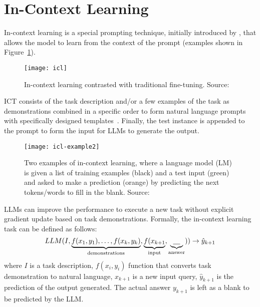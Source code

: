 \section{In-Context Learning}
\label{sec:in-context-learning}
In-context learning is a special prompting technique, initially introduced by \textcite{brown2020language}, that allows the model to learn from the context of the prompt (examples shown in Figure~\ref{fig:in-context-learning}).
\begin{figure}[h!]
	\centering
	\texttt{[image: icl]}
	\caption{In-context learning contrasted with traditional fine-tuning. Source: \textcite{brown2020language}}
	\label{fig:in-context-learning}
\end{figure}
ICT consists of the task description and/or a few examples of the task as demonstrations combined in a specific order to form natural language prompts with specifically designed templates~\cite{brown2020language}.
Finally, the test instance is appended to the prompt to form the input for LLMs to generate the output.
\begin{figure}
	\centering
	\texttt{[image: icl-example2]}
	\caption{Two examples of in-context learning, where a language model (LM) is given a list of training examples (black) and a test input (green) and asked to make a prediction (orange) by predicting the next tokens/words to fill in the blank. Source: \textcite{stanford2023understandingincontext}}
	\label{fig:icl-example2}
\end{figure}
LLMs can improve the performance to execute a new task without explicit gradient update based on task demonstrations.
Formally, the in-context learning task can be defined as follows:
\begin{equation}
	LLM(I, \underbrace{f(x_1, y_1), \dots, f(x_k, y_k)}_\text{demonstrations}, \underbrace{f(x_{k+1}}_\text{input}, \underbrace{\uline{~~~}}_\text{answer})) \rightarrow \hat{y}_{k+1}
	\label{eq:ict}
\end{equation}
where $I$ is a task description, $f(x_i, y_i)$ function that converts task demonstration to natural language, $x_{k+1}$ is a new input query, $\hat{y}_{k+1}$ is the prediction of the output generated.
The actual answer $y_{k+1}$ is left as a blank to be predicted by the LLM\@.

